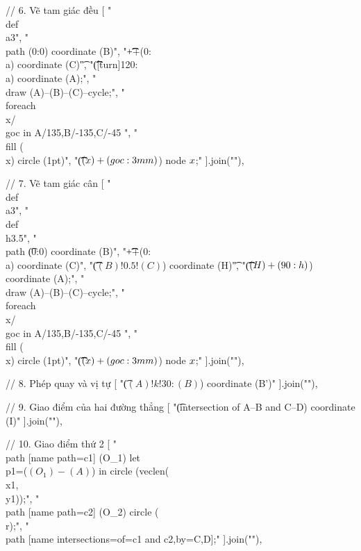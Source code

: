 // 6. Vẽ tam giác đều
[
"\t\\def\\a{3}",
"\t\\path (0:0) coordinate (B)",
"\t\t\t++(0:\\a) coordinate (C)\t",
"\t\t\t([turn]120:\\a) coordinate (A);",
"\t\\draw (A)--(B)--(C)--cycle;",
"\t\\foreach \\x/ \\goc in {A/135,B/-135,C/-45} ",
"\t\t\t\\fill (\\x) circle (1pt)",
"\t\t\t($(\\x)+(\\goc:3mm)$) node {$\\x$};"
].join("\n"),

// 7. Vẽ tam giác cân
[
"\t\\def\\a{3}",
"\t\\def\\h{3.5}",
"\t\\path \t(0:0) coordinate (B)",
"\t\t\t++(0:\\a) coordinate (C)",
"\t\t\t($(B)!0.5!(C)$) coordinate (H)\t",
"\t\t\t($(H)+(90:\\h)$) coordinate (A);",
"\t\\draw (A)--(B)--(C)--cycle;",
"\t\\foreach \\x/ \\goc in {A/135,B/-135,C/-45} ",
"\t\t\t\\fill (\\x) circle (1pt)",
"\t\t\t($(\\x)+(\\goc:3mm)$) node {$\\x$};"
].join("\n"),

// 8. Phép quay và vị tự
[
"\t($(A)!k!30:(B)$) coordinate (B')"
].join("\n"),

// 9. Giao điểm của hai đường thẳng
[
"\t(intersection of A--B and C--D) coordinate (I)"
].join("\n"),

// 10. Giao điểm thứ 2
[
"\t\\path [name path=c1] (O_1)  let\\p1=($(O_1)-(A)$) in circle ({veclen(\\x1,\\y1)});",
"\t\\path [name path=c2] (O_2) circle (\\r);",
"\t\\path [name intersections={of=c1 and c2,by={C,D}}];"
].join("\n"),

